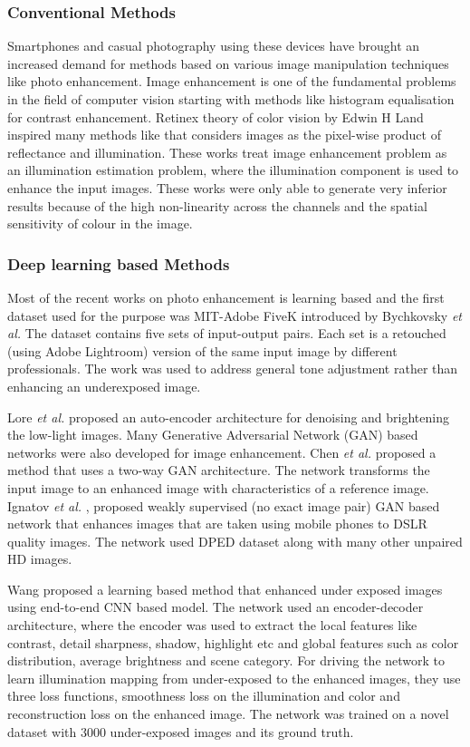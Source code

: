 \documentclass[runningheads]{llncs}
\newcommand{\etal}{\textit{et al. }}
\begin{document}
\subsubsection{Conventional Methods}
\par
Smartphones and casual photography using these
devices have brought an increased demand for methods based on various image
manipulation techniques like photo enhancement. Image enhancement is one of
the fundamental problems in the field of computer vision starting with methods
like histogram equalisation for contrast enhancement. Retinex theory of color
vision \cite{retinex} by Edwin H Land inspired many methods like \cite{retinex2}\cite{retinex_1} that considers images as the pixel-wise product of reflectance and illumination. These works treat image enhancement problem as an illumination estimation problem, where the illumination component is used to enhance the input images. These works were
only able to generate very inferior results because of the high non-linearity across
the channels and the spatial sensitivity of colour in the image.
\par
\subsubsection{Deep learning based Methods}
\par
Most of the recent works on photo enhancement is learning based and the first dataset used for the purpose was MIT-Adobe FiveK \cite{MIT_dataset} introduced by Bychkovsky \etal The dataset contains five sets of  input-output pairs. Each set is a retouched (using Adobe Lightroom) version of the same input image by different professionals.
The work was used to address general tone adjustment rather than enhancing an underexposed image.
\par
Lore \etal \cite{LLNet} proposed an auto-encoder architecture for denoising and brightening the low-light images.
Many Generative Adversarial Network (GAN) based networks were also developed for image enhancement. Chen \etal \cite{Deep_photo_enhance} proposed a method that uses a two-way GAN architecture. The network transforms the input image to an enhanced image with characteristics of a reference image.  Ignatov \etal \cite{WEPSE}, proposed weakly supervised (no exact image pair) GAN based network that enhances images that are taken using mobile phones to DSLR quality images. The network used DPED dataset \cite{DPED} along with many other unpaired HD images.
\par
Wang proposed a learning based method \cite{wang} that enhanced under exposed images using end-to-end CNN based model. The network used an encoder-decoder architecture, where the encoder was used to extract the local features like contrast, detail sharpness, shadow, highlight etc and global features such as color distribution, average brightness and scene category. For driving the network to learn illumination mapping from under-exposed to the enhanced images, they use three loss functions, smoothness loss on the illumination and color and
reconstruction loss on the enhanced image. The network was trained on
a novel dataset with 3000 under-exposed images and its ground truth.
\end{document}
